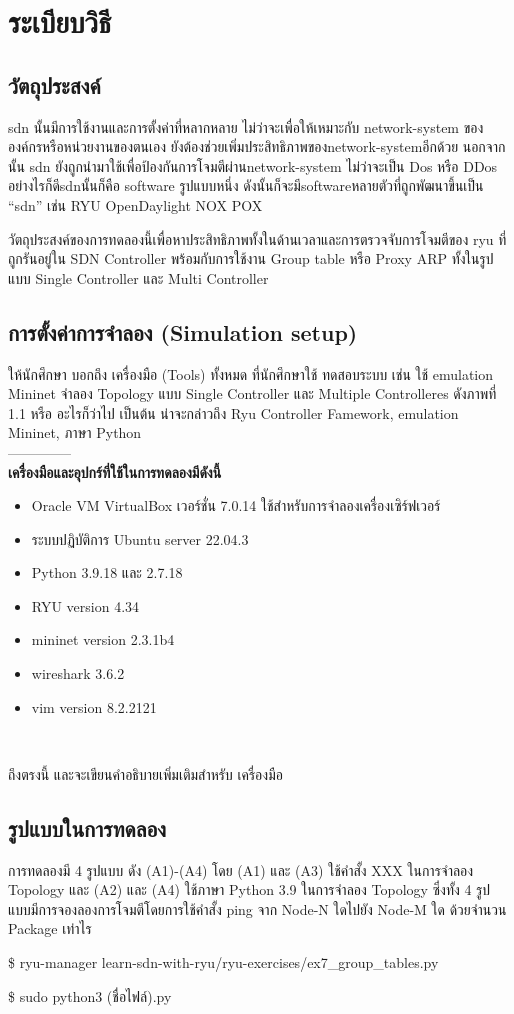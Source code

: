 \section{ระเบียบวิธี} 

\subsection{วัตถุประสงค์}  
\indent\indent
\gls{sdn} นั้นมีการใช้งานและการตั้งค่าที่หลากหลาย
ไม่ว่าจะเพื่อให้เหมาะกับ \gls{network-system} ขององค์กรหรือหน่วยงานของตนเอง ยังต้องช่วยเพิ่มประสิทธิภาพของ\gls{network-system}อีกด้วย
นอกจากนั้น \gls{sdn} ยังถูกนำมาใช้เพื่อป้องกันการโจมตีผ่าน\gls{network-system} ไม่ว่าจะเป็น Dos หรือ DDos
อย่างไรก็ดี\gls{sdn}นั้นก็คือ \gls{software} รูปแบบหนึ่ง
ดังนั้นก็จะมี\gls{software}หลายตัวที่ถูกพัฒนาขึ้นเป็น ``\gls{sdn}'' เช่น RYU OpenDaylight NOX POX

วัตถุประสงค์ของการทดลองนี้เพื่อหาประสิทธิภาพทั้งในด้านเวลาและการตรวจจับการโจมตีของ \gls{ryu} ที่ถูกรันอยู่ใน SDN Controller
พร้อมกับการใช้งาน Group table หรือ Proxy ARP ทั้งในรูปแบบ Single Controller และ Multi Controller 
\\
\subsection{การตั้งค่าการจำลอง (Simulation setup)}
\indent\indent
ให้นักศึกษา บอกถึง เครื่องมือ (Tools) ทั้งหมด ที่นักศึกษาใช้ ทดสอบระบบ เช่น ใช้  emulation Mininet จำลอง Topology แบบ Single Controller และ Multiple
Controlleres ดังภาพที่ 1.1 หรือ อะไรก็ว่าไป เป็นต้น
น่าจะกล่าวถึง Ryu Controller Famework, emulation Mininet, ภาษา Python 
\\--------------\\
\textbf{เครื่องมือและอุปกร์ที่ใช้ในการทดลองมีดังนี้} 
\begin{itemize}
    \item Oracle VM VirtualBox เวอร์ชั่น 7.0.14 ใช้สำหรับการจำลองเครื่องเซิร์ฟเวอร์
    \item ระบบปฏิบัติการ Ubuntu server 22.04.3
    \item Python 3.9.18 และ 2.7.18
    \item RYU version 4.34
    \item mininet version 2.3.1b4
    \item wireshark 3.6.2
    \item vim version 8.2.2121
\end{itemize}
\\
\begin{LARGE}
     ถึงตรงนี้ และจะเขียนคำอธิบายเพิ่มเติมสำหรับ เครื่องมือ
\end{LARGE}
\subsection{รูปแบบในการทดลอง}
\indent\indent
การทดลองมี 4 รูปแบบ ดัง (A1)-(A4) โดย (A1) และ (A3) ใช้คำสั้ง XXX ในการจำลอง Topology และ (A2) และ (A4) ใช้ภาษา Python 3.9 ในการจำลอง Topology ซึ่งทั้ง 4 รูปแบบมีการจองลองการโจมตีโดยการใช้คำสั้ง ping จาก Node-N ใดไปยัง Node-M ใด ด้วยจำนวน Package เท่าไร

\$ ryu-manager learn-sdn-with-ryu/ryu-exercises/ex7\_group\_tables.py

\$ sudo python3 (ชื่อไฟล์).py

